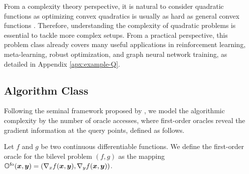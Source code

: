 \documentclass{article}
\begin{document}
From a complexity theory perspective, it is natural to consider quadratic functions as optimizing convex quadratics is usually as hard as general convex functions \citep[Theorem 2.1.13]{nesterov2018lectures}. Therefore, 
understanding the complexity of quadratic problems is essential to tackle more complex setups.
From a practical perspective, this problem class already covers many useful applications in reinforcement learning, meta-learning, robust optimization, and graph neural network training, as detailed in Appendix \ref{apx:example-Q}.


\subsection{Algorithm Class}

Following the seminal framework proposed by \citet{nemirovskij1983problem}, we model the algorithmic complexity by the number of oracle accesses, where first-order oracles reveal the gradient information at the query points, defined as follows.

\begin{dfn}[First-order oracle] 
Let $f$ and $g$ be two continuous differentiable functions. We define the first-order oracle 
for the bilevel problem $(f,g)$
as the mapping ${\mathbb{O}}^{\rm fo}({\bm{x}},{\bm{y}}) = ( \nabla_x f({\bm{x}},{\bm{y}}), \nabla_y f({\bm{x}},{\bm{y}}) ) $.
\end{dfn}
\end{document}
